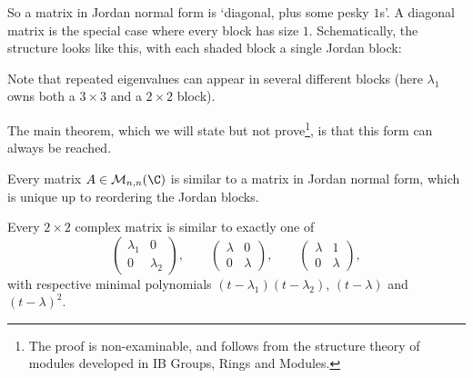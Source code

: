 So a matrix in Jordan normal form is `diagonal, plus some pesky $1$s'. A diagonal matrix is the special case where every block has size $1$. Schematically, the structure looks like this, with each shaded block a single Jordan block:
\begin{center}
\end{center}
Note that repeated eigenvalues can appear in several different blocks (here $\lambda_1$ owns both a $3 \times 3$ and a $2 \times 2$ block).

The main theorem, which we will state but not prove\footnote{The proof is non-examinable, and follows from the structure theory of modules developed in IB Groups, Rings and Modules.}, is that this form can always be reached.

\begin{theorem}
    Every matrix $A \in \mathcal{M}_{n,n}(\C)$ is similar to a matrix in Jordan normal form, which is unique up to reordering the Jordan blocks.
\end{theorem}

\begin{example}
    Every $2 \times 2$ complex matrix is similar to exactly one of
    $$
    \begin{pmatrix}
        \lambda_1 & 0 \\ 0 & \lambda_2
    \end{pmatrix}, \qquad
    \begin{pmatrix}
        \lambda & 0 \\ 0 & \lambda
    \end{pmatrix}, \qquad
    \begin{pmatrix}
        \lambda & 1 \\ 0 & \lambda
    \end{pmatrix},
    $$
    with respective minimal polynomials $(t - \lambda_1)(t - \lambda_2)$, $(t - \lambda)$ and $(t - \lambda)^2$.
\end{example}

